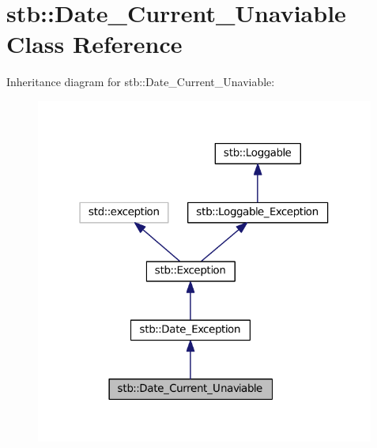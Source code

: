 \hypertarget{classstb_1_1Date__Current__Unaviable}{\section{stb\+:\+:Date\+\_\+\+Current\+\_\+\+Unaviable Class Reference}
\label{classstb_1_1Date__Current__Unaviable}
}


Inheritance diagram for stb\+:\+:Date\+\_\+\+Current\+\_\+\+Unaviable\+:
\nopagebreak
\begin{figure}[H]
\begin{center}
\leavevmode
\includegraphics[width=316pt]{classstb_1_1Date__Current__Unaviable__inherit__graph}
\end{center}
\end{figure}


